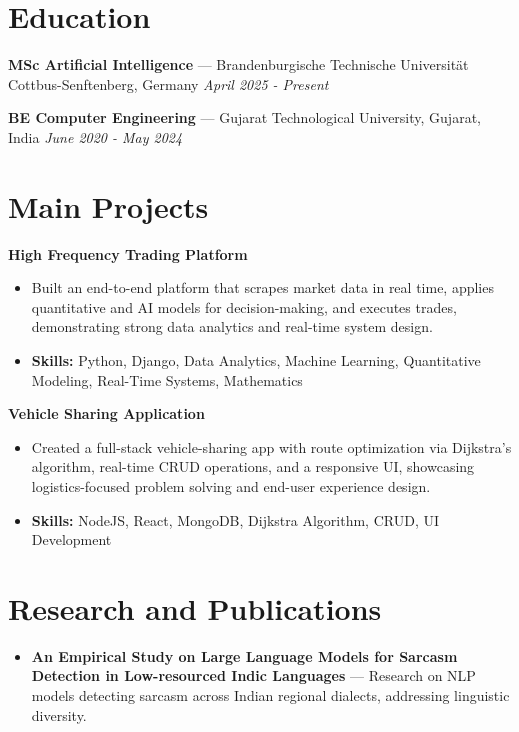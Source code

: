 \documentclass[a4paper,10pt]{article}
\begin{document}
\section*{Education}
\textbf{MSc Artificial Intelligence} — Brandenburgische Technische Universität Cottbus-Senftenberg, Germany \hfill \textit{April 2025 - Present}\par
\vspace{1.5pt}
\textbf{BE Computer Engineering} — Gujarat Technological University, Gujarat, India \hfill \textit{June 2020 - May 2024}\par

\section*{Main Projects}
\textbf{High Frequency Trading Platform}\par
\vspace{1pt}
\begin{itemize}
  \item Built an end-to-end platform that scrapes market data in real time, applies quantitative and AI models for decision-making, and executes trades, demonstrating strong data analytics and real-time system design.
  \item \textbf{Skills:} Python, Django, Data Analytics, Machine Learning, Quantitative Modeling, Real-Time Systems, Mathematics
\end{itemize}
\vspace{3pt}
\textbf{Vehicle Sharing Application}\par
\vspace{1pt}
\begin{itemize}
  \item Created a full-stack vehicle-sharing app with route optimization via Dijkstra's algorithm, real-time CRUD operations, and a responsive UI, showcasing logistics-focused problem solving and end-user experience design.
  \item \textbf{Skills:} NodeJS, React, MongoDB, Dijkstra Algorithm, CRUD, UI Development
\end{itemize}

\section*{Research and Publications}
\begin{itemize}
\item \textbf{An Empirical Study on Large Language Models for Sarcasm Detection in Low-resourced Indic Languages} — Research on NLP models detecting sarcasm across Indian regional dialects, addressing linguistic diversity.
\end{itemize}
\end{document}

